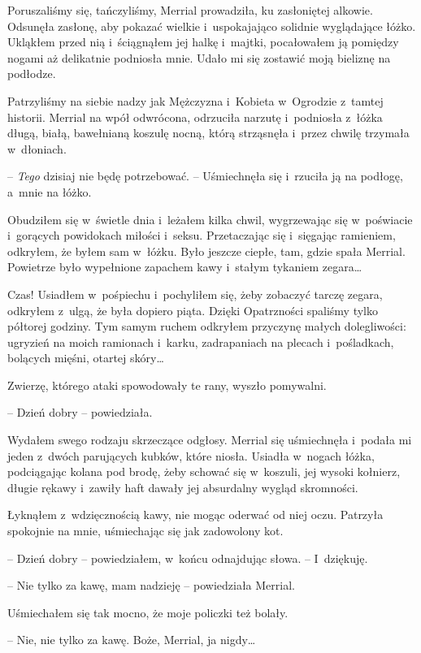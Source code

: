 \documentclass[oneside,polish,11pt,sfheadings]{mwbk}
\begin{document}
Poruszaliśmy się, tańczyliśmy, Merrial prowadziła, ku zasłoniętej
alkowie. Odsunęła zasłonę, aby pokazać wielkie i~uspokajająco solidnie
wyglądające łóżko. Ukląkłem przed nią i~ściągnąłem jej halkę i~majtki,
pocałowałem ją pomiędzy nogami aż delikatnie podniosła mnie. Udało mi
się zostawić moją bieliznę na podłodze.

Patrzyliśmy na siebie nadzy jak Mężczyzna i~Kobieta w~Ogrodzie z~tamtej
historii. Merrial na wpół odwrócona, odrzuciła narzutę i~podniosła z~łóżka długą, białą, bawełnianą koszulę nocną, którą strząsnęła i~przez
chwilę trzymała w~dłoniach.

-- \textit{Tego} dzisiaj nie będę potrzebować. -- Uśmiechnęła się i~rzuciła
ją na podłogę, a~mnie na łóżko.

Obudziłem się w~świetle dnia i~leżałem kilka chwil, wygrzewając się w~poświacie i~gorących powidokach miłości i~seksu. Przetaczając się i~sięgając ramieniem, odkryłem, że byłem sam w~łóżku. Było jeszcze ciepłe,
tam, gdzie spała Merrial. Powietrze było wypełnione zapachem kawy i~stałym tykaniem zegara\ldots

Czas! Usiadłem w~pośpiechu i~pochyliłem się, żeby zobaczyć tarczę
zegara, odkryłem z~ulgą, że była dopiero piąta. Dzięki Opatrzności
spaliśmy tylko półtorej godziny. Tym samym ruchem odkryłem przyczynę
małych dolegliwości: ugryzień na moich ramionach i~karku, zadrapaniach
na plecach i~pośladkach, bolących mięśni, otartej skóry\ldots

Zwierzę, którego ataki spowodowały te rany, wyszło pomywalni.

-- Dzień dobry -- powiedziała.

Wydałem swego rodzaju skrzeczące odgłosy. Merrial się uśmiechnęła i~podała mi jeden z~dwóch parujących kubków, które niosła. Usiadła w~nogach łóżka, podciągając kolana pod brodę, żeby schować się w~koszuli,
jej wysoki kołnierz, długie rękawy i~zawiły haft dawały jej absurdalny
wygląd skromności.

Łyknąłem z~wdzięcznością kawy, nie mogąc oderwać od niej oczu. Patrzyła
spokojnie na mnie, uśmiechając się jak zadowolony kot.

-- Dzień dobry -- powiedziałem, w~końcu odnajdując słowa. -- I~dziękuję.

-- Nie tylko za kawę, mam nadzieję -- powiedziała Merrial.

Uśmiechałem się tak mocno, że moje policzki też bolały.

-- Nie, nie tylko za kawę. Boże, Merrial, ja nigdy\ldots
\end{document}
